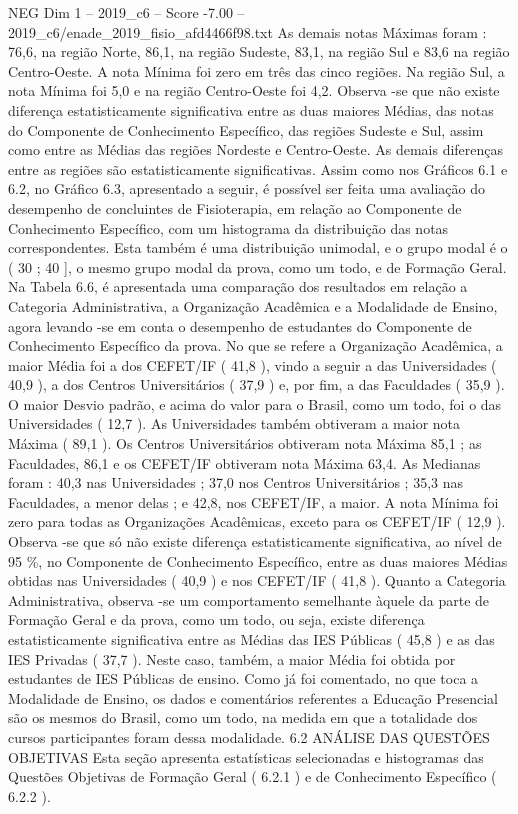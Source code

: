 \begin{textsample}{NEG Dim 1 – 2019\_c6 – Score -7.00 – 2019\_c6/enade\_2019\_fisio\_afd4466f98.txt}
As demais notas Máximas foram : 76,6, na região Norte, 86,1, na região Sudeste, 83,1, na região Sul e 83,6 na região Centro-Oeste.
A nota Mínima foi zero em três das cinco regiões.
Na região Sul, a nota Mínima foi 5,0 e na região Centro-Oeste foi 4,2.
Observa -se que não existe diferença estatisticamente significativa entre as duas maiores Médias, das notas do Componente de Conhecimento Específico, das regiões Sudeste e Sul, assim como entre as Médias das regiões Nordeste e Centro-Oeste.
As demais diferenças entre as regiões são estatisticamente significativas.
Assim como nos Gráficos 6.1 e 6.2, no Gráfico 6.3, apresentado a seguir, é possível ser feita uma avaliação do desempenho de concluintes de Fisioterapia, em relação ao Componente de Conhecimento Específico, com um histograma da distribuição das notas correspondentes.
Esta também é uma distribuição unimodal, e o grupo modal é o ( 30 ; 40 ], o mesmo grupo modal da prova, como um todo, e de Formação Geral.
Na Tabela 6.6, é apresentada uma comparação dos resultados em relação a Categoria Administrativa, a Organização Acadêmica e a Modalidade de Ensino, agora levando -se em conta o desempenho de estudantes do Componente de Conhecimento Específico da prova.
No que se refere a Organização Acadêmica, a maior Média foi a dos CEFET/IF ( 41,8 ), vindo a seguir a das Universidades ( 40,9 ), a dos Centros Universitários ( 37,9 ) e, por fim, a das Faculdades ( 35,9 ).
O maior Desvio padrão, e acima do valor para o Brasil, como um todo, foi o das Universidades ( 12,7 ).
As Universidades também obtiveram a maior nota Máxima ( 89,1 ).
Os Centros Universitários obtiveram nota Máxima 85,1 ; as Faculdades, 86,1 e os CEFET/IF obtiveram nota Máxima 63,4.
As Medianas foram : 40,3 nas Universidades ; 37,0 nos Centros Universitários ; 35,3 nas Faculdades, a menor delas ; e 42,8, nos CEFET/IF, a maior.
A nota Mínima foi zero para todas as Organizações Acadêmicas, exceto para os CEFET/IF ( 12,9 ).
Observa -se que só não existe diferença estatisticamente significativa, ao nível de 95 \%, no Componente de Conhecimento Específico, entre as duas maiores Médias obtidas nas Universidades ( 40,9 ) e nos CEFET/IF ( 41,8 ).
Quanto a Categoria Administrativa, observa -se um comportamento semelhante àquele da parte de Formação Geral e da prova, como um todo, ou seja, existe diferença estatisticamente significativa entre as Médias das IES Públicas ( 45,8 ) e as das IES Privadas ( 37,7 ).
Neste caso, também, a maior Média foi obtida por estudantes de IES Públicas de ensino.
Como já foi comentado, no que toca a Modalidade de Ensino, os dados e comentários referentes a Educação Presencial são os mesmos do Brasil, como um todo, na medida em que a totalidade dos cursos participantes foram dessa modalidade. 6.2 ANÁLISE DAS QUESTÕES OBJETIVAS Esta seção apresenta estatísticas selecionadas e histogramas das Questões Objetivas de Formação Geral ( 6.2.1 ) e de Conhecimento Específico ( 6.2.2 ).

\end{textsample}
